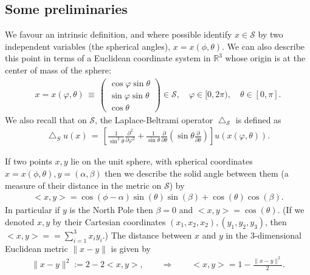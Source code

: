 \documentclass[final]{siamltex}
\newcommand{\lap}{\bigtriangleup}
\renewcommand{\S} {\mathcal{S}}
\begin{document}
\subsection{Some preliminaries}
 We favour an intrinsic definition, and where possible identify $x\in \S$ by two independent variables (the spherical angles), $x=x(\phi,\theta)$. We can also describe this point in terms of a Euclidean coordinate system in $\mathbb{R}^3$ whose origin is at the center of mass of the sphere: 
\begin{align*}
 x= x(\varphi,\theta) \, \equiv \, \left( 
  \begin{array}{c}
    \cos \varphi \sin \theta \\
    \sin \varphi \sin \theta \\
    \cos \theta
  \end{array} 
  \right) \in{\S}, \quad \varphi \in [0,2\pi), 
    \quad \theta \in [0,\pi].
\end{align*}
We also recall that on $\S$, the Laplace-Beltrami operator  $\lap_\S$ is defined as
\begin{align*}
  \lap_S u(x) \, = \, \left[
  \frac{1}{\sin^2 \theta} \frac{\partial^2}{\partial \varphi^2} +
  \frac{1}{\sin \theta} \frac{\partial}{\partial \theta}
  \left(\sin \theta \frac{\partial}{ \partial \theta}\right)
  \right] u(x(\varphi,\theta)).
\end{align*}

If two points $x,y$ lie on the unit sphere, with
spherical coordinates $x=x(\phi,\theta), y=(\alpha,\beta)$ then we describe the solid angle between them (a measure of their distance in the metric on $\S$)  by \begin{align*}
  <x,y> =\cos(\phi-\alpha)\sin(\theta)\sin(\beta)+\cos(\theta)\cos(\beta).
\end{align*} In particular if $y$ is the North Pole then  $\beta=0$ and $<x,y>=\cos(\theta)$. (If we denoted $x,y$  by their Cartesian coordinates $(x_1,x_2,x_2),(y_1,y_2,y_3)$, then $<x,y>== \sum_{i=1}^3 x_iy_i$.) The distance between $x$ and $y$ in the 3-dimensional Euclidean metric
$\|x-y\|$ is given
by 
\begin{align*}
  \|x-y\|^2:=
  2-2<x,y>, \qquad \Rightarrow \qquad <x,y>= 1-\frac{\|x-y\|^2}{2}.
\end{align*}
\end{document}
